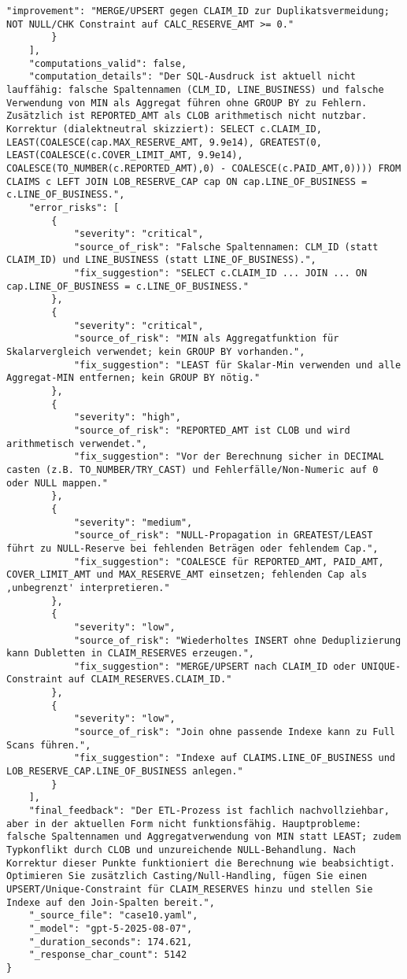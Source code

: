 \begin{lstlisting}[caption={Ausgabe: GPT-5 Anwendungsfall 10 Hauptdurchlauf},label={gpt_case10_prompt1}]
            "improvement": "MERGE/UPSERT gegen CLAIM_ID zur Duplikatsvermeidung; NOT NULL/CHK Constraint auf CALC_RESERVE_AMT >= 0."
        }
    ],
    "computations_valid": false,
    "computation_details": "Der SQL-Ausdruck ist aktuell nicht lauffähig: falsche Spaltennamen (CLM_ID, LINE_BUSINESS) und falsche Verwendung von MIN als Aggregat führen ohne GROUP BY zu Fehlern. Zusätzlich ist REPORTED_AMT als CLOB arithmetisch nicht nutzbar. Korrektur (dialektneutral skizziert): SELECT c.CLAIM_ID, LEAST(COALESCE(cap.MAX_RESERVE_AMT, 9.9e14), GREATEST(0, LEAST(COALESCE(c.COVER_LIMIT_AMT, 9.9e14), COALESCE(TO_NUMBER(c.REPORTED_AMT),0) - COALESCE(c.PAID_AMT,0)))) FROM CLAIMS c LEFT JOIN LOB_RESERVE_CAP cap ON cap.LINE_OF_BUSINESS = c.LINE_OF_BUSINESS.",
    "error_risks": [
        {
            "severity": "critical",
            "source_of_risk": "Falsche Spaltennamen: CLM_ID (statt CLAIM_ID) und LINE_BUSINESS (statt LINE_OF_BUSINESS).",
            "fix_suggestion": "SELECT c.CLAIM_ID ... JOIN ... ON cap.LINE_OF_BUSINESS = c.LINE_OF_BUSINESS."
        },
        {
            "severity": "critical",
            "source_of_risk": "MIN als Aggregatfunktion für Skalarvergleich verwendet; kein GROUP BY vorhanden.",
            "fix_suggestion": "LEAST für Skalar-Min verwenden und alle Aggregat-MIN entfernen; kein GROUP BY nötig."
        },
        {
            "severity": "high",
            "source_of_risk": "REPORTED_AMT ist CLOB und wird arithmetisch verwendet.",
            "fix_suggestion": "Vor der Berechnung sicher in DECIMAL casten (z.B. TO_NUMBER/TRY_CAST) und Fehlerfälle/Non-Numeric auf 0 oder NULL mappen."
        },
        {
            "severity": "medium",
            "source_of_risk": "NULL-Propagation in GREATEST/LEAST führt zu NULL-Reserve bei fehlenden Beträgen oder fehlendem Cap.",
            "fix_suggestion": "COALESCE für REPORTED_AMT, PAID_AMT, COVER_LIMIT_AMT und MAX_RESERVE_AMT einsetzen; fehlenden Cap als ,unbegrenzt' interpretieren."
        },
        {
            "severity": "low",
            "source_of_risk": "Wiederholtes INSERT ohne Deduplizierung kann Dubletten in CLAIM_RESERVES erzeugen.",
            "fix_suggestion": "MERGE/UPSERT nach CLAIM_ID oder UNIQUE-Constraint auf CLAIM_RESERVES.CLAIM_ID."
        },
        {
            "severity": "low",
            "source_of_risk": "Join ohne passende Indexe kann zu Full Scans führen.",
            "fix_suggestion": "Indexe auf CLAIMS.LINE_OF_BUSINESS und LOB_RESERVE_CAP.LINE_OF_BUSINESS anlegen."
        }
    ],
    "final_feedback": "Der ETL-Prozess ist fachlich nachvollziehbar, aber in der aktuellen Form nicht funktionsfähig. Hauptprobleme: falsche Spaltennamen und Aggregatverwendung von MIN statt LEAST; zudem Typkonflikt durch CLOB und unzureichende NULL-Behandlung. Nach Korrektur dieser Punkte funktioniert die Berechnung wie beabsichtigt. Optimieren Sie zusätzlich Casting/Null-Handling, fügen Sie einen UPSERT/Unique-Constraint für CLAIM_RESERVES hinzu und stellen Sie Indexe auf den Join-Spalten bereit.",
    "_source_file": "case10.yaml",
    "_model": "gpt-5-2025-08-07",
    "_duration_seconds": 174.621,
    "_response_char_count": 5142
}
\end{lstlisting}

